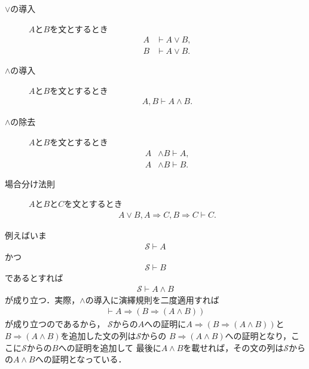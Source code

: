 	\begin{description}
		\item[$\vee$の導入] $A$と$B$を文とするとき
			\begin{align}
				A &\vdash A \vee B, \\
				B &\vdash A \vee B.
			\end{align}
		
		\item[$\wedge$の導入] $A$と$B$を文とするとき
			\begin{align}
				A,B \vdash A \wedge B.
			\end{align}
		
		\item[$\wedge$の除去] $A$と$B$を文とするとき
			\begin{align}
				A &\wedge B \vdash A, \\
				A &\wedge B \vdash B.
			\end{align}
			
		\item[場合分け法則] $A$と$B$と$C$を文とするとき
			\begin{align}
				A \vee B, A \Longrightarrow C, B \Longrightarrow C \vdash C.
			\end{align}
	\end{description}
	
	例えばいま
	\begin{align}
		\mathscr{S} \vdash A
	\end{align}
	かつ
	\begin{align}
		\mathscr{S} \vdash B
	\end{align}
	であるとすれば
	\begin{align}
		\mathscr{S} \vdash A \wedge B
	\end{align}
	が成り立つ．実際，$\wedge$の導入に演繹規則を二度適用すれば
	\begin{align}
		\vdash A \Longrightarrow (B \Longrightarrow (A \wedge B))
	\end{align}
	が成り立つのであるから，
	$\mathscr{S}$からの$A$への証明に$A \Longrightarrow (B \Longrightarrow (A \wedge B))$と
	$B \Longrightarrow (A \wedge B)$を追加した文の列は$\mathscr{S}$からの
	$B \Longrightarrow (A \wedge B)$への証明となり，ここに$\mathscr{S}$からの$B$への証明を追加して
	最後に$A \wedge B$を載せれば，その文の列は$\mathscr{S}$からの$A \wedge B$への証明となっている．
	
	
	
